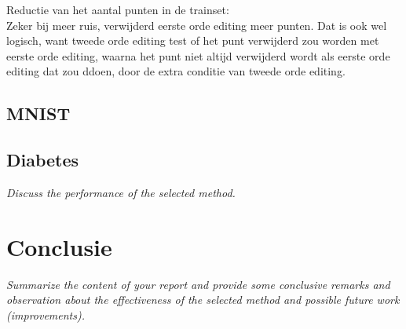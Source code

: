\documentclass{article}
\begin{document}
Reductie van het aantal punten in de trainset: \\
Zeker bij meer ruis, verwijderd eerste orde editing meer punten. Dat is ook wel logisch, want tweede orde editing test of het punt verwijderd zou worden met eerste orde editing, waarna het punt niet altijd verwijderd wordt als eerste orde editing dat zou ddoen, door de extra conditie van tweede orde editing.

\subsection{MNIST}

\subsection{Diabetes}



\emph{Discuss the performance of the selected method.}\\



\section{Conclusie}
\emph{Summarize the content of your report and provide some conclusive remarks and observation about the effectiveness of the selected method and possible future work (improvements).} \\
\end{document}
